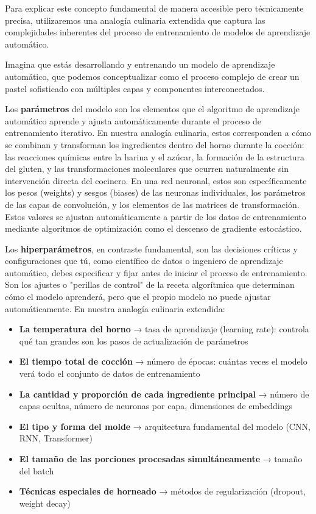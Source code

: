 Para explicar este concepto fundamental de manera accesible pero técnicamente precisa, utilizaremos una analogía culinaria extendida que captura las complejidades inherentes del proceso de entrenamiento de modelos de aprendizaje automático.

Imagina que estás desarrollando y entrenando un modelo de aprendizaje automático, que podemos conceptualizar como el proceso complejo de crear un pastel sofisticado con múltiples capas y componentes interconectados.

Los \textbf{parámetros} del modelo son los elementos que el algoritmo de aprendizaje automático aprende y ajusta automáticamente durante el proceso de entrenamiento iterativo. En nuestra analogía culinaria, estos corresponden a cómo se combinan y transforman los ingredientes dentro del horno durante la cocción: las reacciones químicas entre la harina y el azúcar, la formación de la estructura del gluten, y las transformaciones moleculares que ocurren naturalmente sin intervención directa del cocinero. En una red neuronal, estos son específicamente los pesos (weights) y sesgos (biases) de las neuronas individuales, los parámetros de las capas de convolución, y los elementos de las matrices de transformación. Estos valores se ajustan automáticamente a partir de los datos de entrenamiento mediante algoritmos de optimización como el descenso de gradiente estocástico.

Los \textbf{hiperparámetros}, en contraste fundamental, son las decisiones críticas y configuraciones que tú, como científico de datos o ingeniero de aprendizaje automático, debes especificar y fijar antes de iniciar el proceso de entrenamiento. Son los ajustes o "perillas de control" de la receta algorítmica que determinan cómo el modelo aprenderá, pero que el propio modelo no puede ajustar automáticamente. En nuestra analogía culinaria extendida:

\begin{itemize}
    \item \textbf{La temperatura del horno} → tasa de aprendizaje (learning rate): controla qué tan grandes son los pasos de actualización de parámetros
    \item \textbf{El tiempo total de cocción} → número de épocas: cuántas veces el modelo verá todo el conjunto de datos de entrenamiento
    \item \textbf{La cantidad y proporción de cada ingrediente principal} → número de capas ocultas, número de neuronas por capa, dimensiones de embeddings
    \item \textbf{El tipo y forma del molde} → arquitectura fundamental del modelo (CNN, RNN, Transformer)
    \item \textbf{El tamaño de las porciones procesadas simultáneamente} → tamaño del batch
    \item \textbf{Técnicas especiales de horneado} → métodos de regularización (dropout, weight decay)
\end{itemize}

